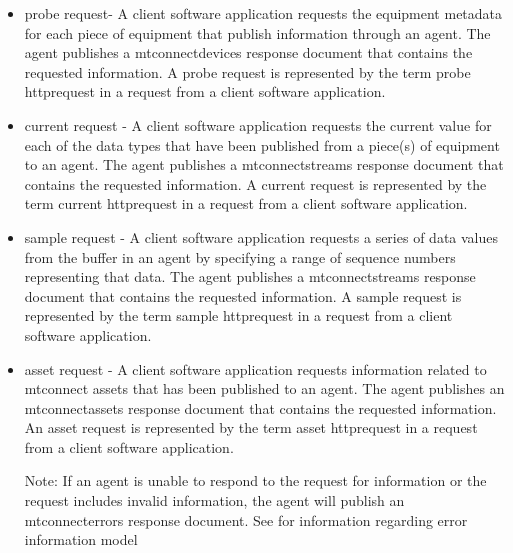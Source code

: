 \documentclass{mtconnect}	%
\begin{document}
\begin{itemize}
\item \gls{probe request}- A client software application requests the \gls{equipment metadata} for each piece of equipment that \MAY publish information through an \gls{agent}.  The \gls{agent} publishes a \gls{mtconnectdevices response document} that contains the requested information.  A \gls{probe request} is represented by the term \gls{probe httprequest} in a \gls{request} from a client software application.

\item \gls{current request} - A client software application requests the current value for each of the data types that have been published from a piece(s) of equipment to an \gls{agent}.  The \gls{agent} publishes a \gls{mtconnectstreams response document} that contains the requested information.  A \gls{current request} is represented by the term \gls{current httprequest} in a \gls{request} from a client software application.

\item \gls{sample request} - A client software application requests a series of data values from the \gls{buffer} in an \gls{agent} by specifying a range of \glspl{sequence number} representing that data.  The \gls{agent} publishes a \gls{mtconnectstreams response document} that contains the requested information.  A \gls{sample request} is represented by the term \gls{sample httprequest} in a \gls{request} from a client software application.

\item \gls{asset request} - A client software application requests information related to \glspl{mtconnect asset} that has been published to an \gls{agent}.  The \gls{agent} publishes an \gls{mtconnectassets response document} that contains the requested information.  An \gls{asset request} is represented by the term \gls{asset httprequest} in a \gls{request} from a client software application.

\begin{note}
Note: If an \gls{agent} is unable to respond to the request for information or the request includes invalid information, the \gls{agent} will publish an \gls{mtconnecterrors response document}. See  for information regarding \gls{error information model}

\end{note}

\end{itemize}
\end{document}
